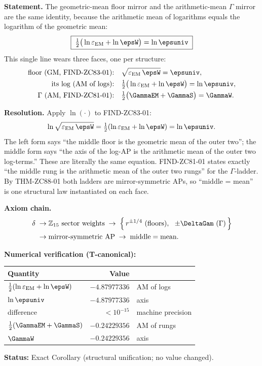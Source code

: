 \documentclass[12pt, a4paper]{article}
\renewcommand{\epsEM}{\varepsilon_{\rm EM}}     %
\begin{document}
\begin{formalbox}[title={COR-ZC88-01: FIND-ZC83-01 $\equiv$ FIND-ZC81-01
  under the log-map ($R_0$, Exact)}]

\textbf{Statement.}
The geometric-mean floor mirror and the arithmetic-mean $\Gamma$ mirror are
the same identity, because the arithmetic mean of logarithms equals the
logarithm of the geometric mean:
\begin{equation}
  \boxed{\;\tfrac12\big(\ln\epsEM+\ln\epsW\big)=\ln\epsuniv\;}
  \label{eq:cor-main-zc88}
\end{equation}
This single line wears three faces, one per structure:
\begin{align*}
  \text{floor (GM, FIND-ZC83-01):}\quad
    &\sqrt{\epsEM\,\epsW}=\epsuniv,\\
  \text{its log (AM of logs):}\quad
    &\tfrac12\big(\ln\epsEM+\ln\epsW\big)=\ln\epsuniv,\\
  \text{$\Gamma$ (AM, FIND-ZC81-01):}\quad
    &\tfrac12\big(\GammaEM+\GammaS\big)=\GammaW.
\end{align*}

\textbf{Resolution.}
Apply $\ln(\cdot)$ to FIND-ZC83-01:
\[
  \ln\sqrt{\epsEM\,\epsW}
  =\tfrac12(\ln\epsEM+\ln\epsW)
  =\ln\epsuniv.
\]
The left form says ``the middle floor is the geometric mean of the outer
two''; the middle form says ``the axis of the log-AP is the arithmetic mean
of the outer two log-terms.'' These are literally the same equation.
FIND-ZC81-01 states exactly ``the middle rung is the arithmetic mean of the
outer two rungs'' for the $\Gamma$-ladder. By THM-ZC88-01 both ladders are
mirror-symmetric APs, so ``middle = mean'' is one structural law instantiated
on each face.

\textbf{Axiom chain.}
\[
  \begin{aligned}
  \delta \;\to\;& \mathbb{Z}_{15}\ \text{sector weights}
  \;\to\;\Big\{\,r^{\pm1/4}\ \text{(floors)},\ \ \pm\DeltaGam\ (\Gamma)\,\Big\}\\
  \;\to\;& \text{mirror-symmetric AP}
  \;\to\;\text{middle}=\text{mean}.
  \end{aligned}
\]

\textbf{Numerical verification (T-canonical):}
\begin{center}
{\small\renewcommand{\arraystretch}{1.25}
\begin{tabular}{@{}lrl@{}}
\toprule
Quantity & Value & \\
\midrule
$\tfrac12(\ln\epsEM+\ln\epsW)$ & $-4.87977336$ & AM of logs \\
$\ln\epsuniv$                  & $-4.87977336$ & axis \\
difference                     & $<10^{-15}$   & machine precision \\
$\tfrac12(\GammaEM+\GammaS)$   & $-0.24229356$ & AM of rungs \\
$\GammaW$                      & $-0.24229356$ & axis \\
\bottomrule
\end{tabular}}
\end{center}

\textbf{Status:} Exact Corollary (structural unification; no value changed).
\end{formalbox}
\end{document}
